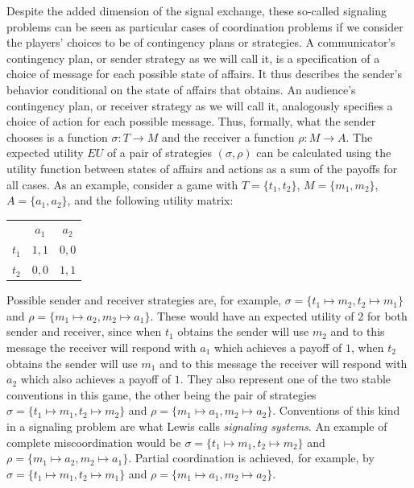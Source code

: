 \documentclass[a4paper]{article}
\begin{document}
Despite the added dimension of the signal exchange, these so-called signaling problems can be seen as particular cases of coordination problems if we consider the players' choices to be of contingency plans or strategies.
A communicator's contingency plan, or sender strategy as we will call it, is a specification of a choice of message for each possible state of affairs.
It thus describes the sender's behavior conditional on the state of affairs that obtains.
An audience's contingency plan, or receiver strategy as we will call it, analogously specifies a choice of action for each possible message.
Thus, formally, what the sender chooses is a function $\sigma : T \rightarrow M$ and the receiver a function $\rho : M \rightarrow A$.
The expected utility $EU$ of a pair of strategies $(\sigma,\rho)$ can be calculated using the utility function between states of affairs and actions as a sum of the payoffs for all cases. %
As an example, consider a game with $T = \lbrace t_1, t_2 \rbrace$, $M = \lbrace m_1, m_2 \rbrace$, $A = \lbrace a_1, a_2 \rbrace$, and the following utility matrix:
\begin{center}
\begin{tabular}{r|c|c|}
\multicolumn{1}{r}{}
 & \multicolumn{1}{c}{$a_1$}
 & \multicolumn{1}{c}{$a_2$} \\ \cline{2-3}
   $t_1$ & $1,1$ & $0,0$ \\ \cline{2-3}
   $t_2$ & $0,0$ & $1,1$ \\ \cline{2-3}
\end{tabular}
\end{center}
Possible sender and receiver strategies are, for example, $\sigma = \lbrace t_1 \mapsto m_2, t_2 \mapsto m_1 \rbrace$ and $\rho = \lbrace m_1 \mapsto a_2, m_2 \mapsto a_1 \rbrace$.
These would have an expected utility of $2$ for both sender and receiver, since when $t_1$ obtains the sender will use $m_2$ and to this message the receiver will respond with $a_1$ which achieves a payoff of $1$, when $t_2$ obtains the sender will use $m_1$ and to this message the receiver will respond with $a_2$ which also achieves a payoff of $1$.
They also represent one of the two stable conventions in this game, the other being the pair of strategies $\sigma = \lbrace t_1 \mapsto m_1, t_2 \mapsto m_2 \rbrace$ and $\rho = \lbrace m_1 \mapsto a_1, m_2 \mapsto a_2 \rbrace$.
Conventions of this kind in a signaling problem are what Lewis calls \emph{signaling systems}.
An example of complete miscoordination would be $\sigma = \lbrace t_1 \mapsto m_1, t_2 \mapsto m_2 \rbrace$ and $\rho = \lbrace m_1 \mapsto a_2, m_2 \mapsto a_1 \rbrace$.
Partial coordination is achieved, for example, by $\sigma = \lbrace t_1 \mapsto m_1, t_2 \mapsto m_1 \rbrace$ and $\rho = \lbrace m_1 \mapsto a_1, m_2 \mapsto a_2 \rbrace$.
\end{document}

